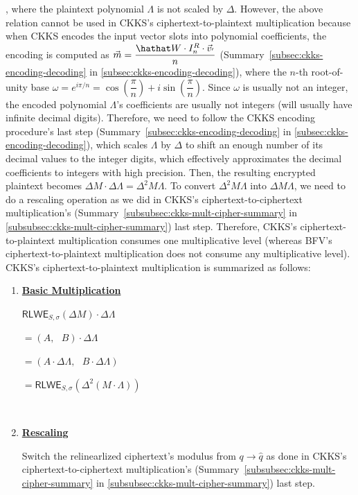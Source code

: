 , where the plaintext polynomial $\Lambda$ is not scaled by $\Delta$. However, the above relation cannot be used in CKKS's ciphertext-to-plaintext multiplication because when CKKS encodes the input vector slots into polynomial coefficients, the encoding is computed as $\vec{m} = \dfrac{\hathat W \cdot I_n^R \cdot \vec{v}_{'}}{n}$ (Summary~\ref*{subsec:ckks-encoding-decoding} in \autoref{subsec:ckks-encoding-decoding}), where the $n$-th root-of-unity base $\omega = e^{i\pi/n} = \cos \left(\dfrac{\pi}{n}\right) + i\sin \left(\dfrac{\pi}{n}\right)$. Since $\omega$ is usually not an integer, the encoded polynomial $\Lambda$'s coefficients are usually not integers (will usually have infinite decimal digits). Therefore, we need to follow the CKKS encoding procedure's last step (Summary~\ref*{subsec:ckks-encoding-decoding} in \autoref{subsec:ckks-encoding-decoding}), which scales $\Lambda$ by $\Delta$ to shift an enough number of its decimal values to the integer digits, which effectively approximates the decimal coefficients to integers with high precision. Then, the resulting encrypted plaintext becomes $\Delta M \cdot \Delta \Lambda = \Delta^2 M \Lambda$. To convert $\Delta^2 M \Lambda$ into $\Delta M \Lambda$, we need to do a rescaling operation as we did in CKKS's ciphertext-to-ciphertext multiplication's (Summary~\ref*{subsubsec:ckks-mult-cipher-summary} in \autoref{subsubsec:ckks-mult-cipher-summary}) last step. Therefore, CKKS's ciphertext-to-plaintext multiplication consumes one multiplicative level (whereas BFV's ciphertext-to-plaintext multiplication does not consume any multiplicative level). CKKS's ciphertext-to-plaintext multiplication is summarized as follows: 



\begin{tcolorbox}[title={\textbf{\tboxlabel{\ref*{subsec:ckks-mult-plain}} CKKS Ciphertext-to-Plaintext Multiplication}}]


\begin{enumerate}
\item \textbf{\underline{Basic Multiplication}}

$\textsf{RLWE}_{S, \sigma}(\Delta M) \cdot \Delta\Lambda$

$= (A, \text{ } B) \cdot \Delta\Lambda$

$= (A \cdot \Delta\Lambda, \text{ }  B \cdot \Delta\Lambda )$

$= \textsf{RLWE}_{S, \sigma}(\Delta^2 (M \cdot \Lambda) )$

$ $

\item \textbf{\underline{Rescaling}}

Switch the relinearlized ciphertext's modulus from $q \rightarrow \hat q$ as done in CKKS's ciphertext-to-ciphertext multiplication's (Summary~\ref*{subsubsec:ckks-mult-cipher-summary} in \autoref{subsubsec:ckks-mult-cipher-summary}) last step. 

\end{enumerate}

\end{tcolorbox}


